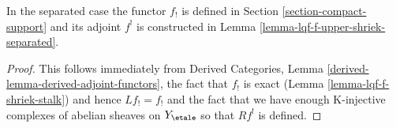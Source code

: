 \noindent
In the separated case the functor $f_!$ is defined in
Section \ref{section-compact-support} and its adjoint
$f^!$ is constructed in Lemma \ref{lemma-lqf-f-upper-shriek-separated}.

\begin{proof}
This follows immediately from
Derived Categories, Lemma \ref{derived-lemma-derived-adjoint-functors},
the fact that $f_!$ is exact (Lemma \ref{lemma-lqf-f-shriek-stalk})
and hence $Lf_! = f_!$
and the fact that we have enough K-injective complexes of abelian sheaves
on $Y_\etale$ so that $Rf^!$ is defined.
\end{proof}




























